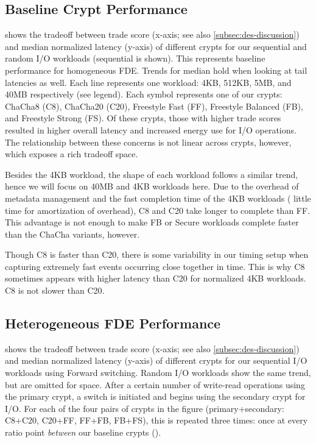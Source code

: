 \subsection{Baseline Crypt Performance}\label{subsec:eval-baseline}



 shows the tradeoff between trade score (x-axis; see
also \cref{subsec:des-discussion}) and median normalized latency (y-axis) of
different crypts for our sequential and random I/O workloads (sequential is
shown). This represents baseline performance for homogeneous FDE. Trends for
median hold when looking at tail latencies as well. Each line represents one
workload: 4KB, 512KB, 5MB, and 40MB respectively (see legend). Each symbol
represents one of our crypts: ChaCha8 (C8), ChaCha20 (C20), Freestyle Fast (FF),
Freestyle Balanced (FB), and Freestyle Strong (FS). Of these crypts, those with
higher trade scores resulted in higher overall latency and increased energy use
for I/O operations. The relationship between these concerns is not linear across
crypts, however, which exposes a rich tradeoff space.

Besides the 4KB workload, the shape of each workload follows a similar trend,
hence we will focus on 40MB and 4KB workloads here. Due to the overhead of
metadata management and the fast completion time of the 4KB workloads (\ie
little time for amortization of overhead), C8 and C20 take longer to complete
than FF. This advantage is not enough to make FB or Secure workloads complete
faster than the ChaCha variants, however.

Though C8 is faster than C20, there is some variability in our timing setup when
capturing extremely fast events occurring close together in time. This is why C8
sometimes appears with higher latency than C20 for normalized 4KB workloads. C8
is not slower than C20.


\subsection{Heterogeneous FDE Performance}\label{subsec:eval-flexible}



 shows the tradeoff between trade score
(x-axis; see also \cref{subsec:des-discussion}) and median normalized
latency (y-axis) of different crypts for our sequential I/O workloads
using Forward switching. Random I/O workloads show the same trend, but 
are omitted for space. After a certain number of write-read operations
using the primary crypt, a switch is initiated and \sys begins using
the secondary crypt for I/O. For each of the four pairs of crypts in
the figure (primary+secondary: C8+C20, C20+FF, FF+FB, FB+FS), this is
repeated three times: once at every ratio point {\em between} our
baseline crypts ().

